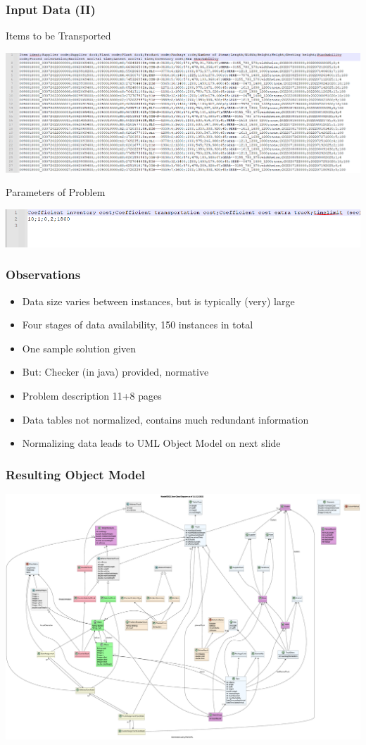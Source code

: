 \documentclass[dvipsnames,aspectratio=169]{beamer}
\begin{document}
\begin{frame}
\frametitle{Input Data (II)}

Items to be Transported

\includegraphics[width=\textwidth]{images/roadefitems}

Parameters of Problem

\includegraphics[width=.7\textwidth]{images/roadefparameters}
\end{frame}

\begin{frame}
\frametitle{Observations}
\begin{itemize}
\item Data size varies between instances, but is typically (very) large
\item Four stages of data availability, 150 instances in total
\item One sample solution given
\item But: Checker (in java) provided, normative
\item Problem description 11+8 pages
\item Data tables not normalized, contains much redundant information
\item Normalizing data leads to UML Object Model on next slide
\end{itemize}
\end{frame}


\begin{frame}
\frametitle{Resulting Object Model}
\includegraphics[width=.7\textwidth]{images/roadefuml}
\end{frame}
\end{document}
